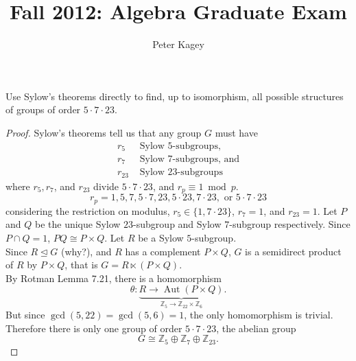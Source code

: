 \documentclass{article}
\newenvironment{problem}[2][Problem]{\begin{trivlist}
\item[\hskip \labelsep {\bfseries #1}\hskip \labelsep {\bfseries #2.}]}{\end{trivlist}}
\newcommand{\Z}{\mathbb Z}
\newcommand{\normalsubgroup}{\trianglelefteq}
\begin{document}
\title{Fall 2012: Algebra Graduate Exam}
\author{Peter Kagey}

\maketitle

\begin{problem}{1}
  Use Sylow's theorems directly to find, up to isomorphism, all possible structures of groups of order $5 \cdot 7 \cdot 23$.
\end{problem}

\begin{proof}
  Sylow's theorems tell us that any group $G$ must have \begin{align*}
    r_5 &\text{ Sylow } 5\text{-subgroups,} \\
    r_7 &\text{ Sylow } 7\text{-subgroups, and} \\
    r_{23} &\text{ Sylow } 23\text{-subgroups}
  \end{align*} where $r_5, r_7$, and $r_{23}$ divide $5 \cdot 7 \cdot 23$, and $r_p \equiv 1 \bmod p$. \[
    r_p = 1, 5, 7, 5 \cdot 7, 23, 5 \cdot 23, 7 \cdot 23, \text{ or } 5 \cdot 7 \cdot 23
  \] considering the restriction on modulus,
  $r_5 \in \{1, 7 \cdot 23\}$, $r_7 = 1$, and $r_{23} = 1$.
  Let $P$ and $Q$ be the unique Sylow $23$-subgroup and Sylow
  $7$-subgroup respectively.
  Since $P \cap Q = 1$, $PQ \cong P \times Q$. Let $R$ be a Sylow $5$-subgroup.
  \\
  Since $R \normalsubgroup G$ (why?), and $R$ has a complement $P \times Q$, $G$ is a
  semidirect product of $R$ by $P \times Q$, that is $G = R \ltimes (P \times Q)$.
  \\
  By Rotman Lemma 7.21, there is a homomorphism \[
    \theta\colon \underbrace{
      R \rightarrow \operatorname{Aut}(P \times Q)
    }_{\Z_5 \rightarrow \Z_{22} \times \Z_6}.
  \]
  But since $\gcd(5, 22) = \gcd(5, 6) = 1$, the only homomorphism is trivial.
  Therefore there is only one group of order $5 \cdot 7 \cdot 23$, the abelian
  group \[
    G \cong \Z_5 \oplus \Z_7 \oplus \Z_{23}.
  \]
\end{proof}
\pagebreak
\end{document}
